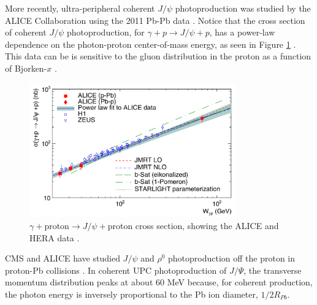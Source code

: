 More recently, ultra-peripheral coherent $J/\psi$ photoproduction was studied by the ALICE Collaboration using the 2011 Pb-Pb data \cite{Abelev:2012ba}. Notice that the cross section of coherent $J/\psi$ photoproduction, for $\gamma+p\rightarrow J/\psi+p$, has a power-law dependence on the photon-proton center-of-mass energy, as seen in Figure \ref{fig:aliceData1} \cite{Klein:2017nqo}. This data can be is sensitive to the gluon distribution in the proton as a function of Bjorken-$x$ \cite{pQCD2011.08}.

\begin{figure}[h!]
\begin{centering}
\includegraphics[width=3.5in]{Chapter2/importfigs/alice_jpsi_data.png}
\par\end{centering}
\caption{$\gamma +$proton$\rightarrow J/\psi +$proton cross section, showing the ALICE and HERA data \cite{Klein:2017nqo}. \label{fig:aliceData1}}
\end{figure}

CMS and ALICE have studied $J/\psi$ and $\rho^0$ photoproduction off the proton in proton-Pb collisions \cite{TheALICE:2014dwa}. In coherent UPC photoproduction of $J/\Psi$, the transverse momentum distribution peaks at about 60 MeV because, for coherent production, the photon energy is inversely proportional to the Pb ion diameter, $1/2R_{Pb}$.

